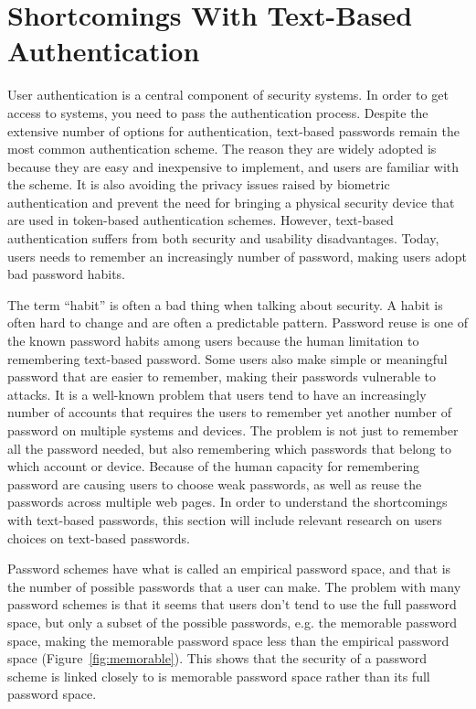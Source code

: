 \section{Shortcomings With Text-Based Authentication} \label{sec:shortcomings}

  User authentication is a central component of security systems. In order to get access to systems, you need to pass the authentication process. Despite the extensive number of options for authentication, text-based passwords remain the most common authentication scheme. The reason they are widely adopted is because they are easy and inexpensive to implement, and users are familiar with the scheme. It is also avoiding the privacy issues raised by biometric authentication and prevent the need for bringing a physical security device that are used in token-based authentication schemes. However, text-based authentication suffers from both security and usability disadvantages. Today, users needs to remember an increasingly number of password, making users adopt bad password habits.

  The term ``habit'' is often a bad thing when talking about security. A habit is often hard to change and are often a predictable pattern. Password reuse is one of the known password habits among users because the human limitation to remembering text-based password. Some users also make simple or meaningful password that are easier to remember, making their passwords vulnerable to attacks. It is a well-known problem that users tend to have an increasingly number of accounts that requires the users to remember yet another number of password on multiple systems and devices. The problem is not just to remember all the password needed, but also remembering which passwords that belong to which account or device. Because of the human capacity for remembering password are causing users to choose weak passwords, as well as reuse the passwords across multiple web pages. In order to understand the shortcomings with text-based passwords, this section will include relevant research on users choices on text-based passwords.

  Password schemes have what is called an empirical password space, and that is the number of possible passwords that a user can make. The problem with many password schemes is that it seems that users don't tend to use the full password space, but only a subset of the possible passwords, e.g. the memorable password space, making the memorable password space less than the empirical password space (Figure~\ref{fig:memorable}). This shows that the security of a password scheme is linked closely to is memorable password space rather than its full password space.

